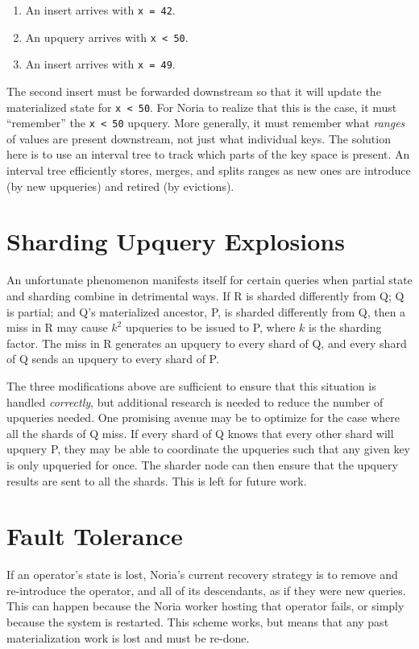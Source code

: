\begin{enumerate}
  \item An insert arrives with \texttt{x = 42}.
  \item An upquery arrives with \texttt{x < 50}.
  \item An insert arrives with \texttt{x = 49}.
\end{enumerate}

The second insert must be forwarded downstream so that it will update the
materialized state for \texttt{x < 50}. For Noria to realize that this is the
case, it must ``remember'' the \texttt{x < 50} upquery. More generally, it must
remember what \emph{ranges} of values are present downstream, not just what
individual keys. The solution here is to use an interval tree to track which
parts of the key space is present. An interval tree efficiently stores, merges,
and splits ranges as new ones are introduce (by new upqueries) and retired (by
evictions).

\section{Sharding Upquery Explosions}

An unfortunate phenomenon manifests itself for certain queries when partial
state and sharding combine in detrimental ways. If R is sharded differently from
Q; Q is partial; and Q's materialized ancestor, P, is sharded differently from
Q, then a miss in R may cause $k^2$ upqueries to be issued to P, where $k$ is
the sharding factor. The miss in R generates an upquery to every shard of Q, and
every shard of Q sends an upquery to every shard of P.

The three modifications above are sufficient to ensure that this situation is
handled \emph{correctly}, but additional research is needed to reduce the number
of upqueries needed. One promising avenue may be to optimize for the case where
all the shards of Q miss. If every shard of Q knows that every other shard will
upquery P, they may be able to coordinate the upqueries such that any given key
is only upqueried for once. The sharder node can then ensure that the upquery
results are sent to all the shards. This is left for future work.

\section{Fault Tolerance}

If an operator's state is lost, Noria's current recovery strategy is to remove
and re-introduce the operator, and all of its descendants, as if they were new
queries. This can happen because the Noria worker hosting that operator fails,
or simply because the system is restarted. This scheme works, but means that any
past materialization work is lost and must be re-done.

